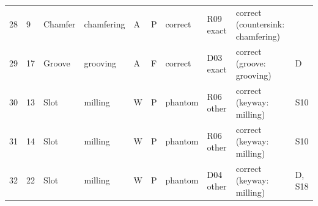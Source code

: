 \begin{table}[htbp]
{\begin{tabular}{p{0.45cm} p{0.55cm} p{1.5cm} p{1.5cm} p{0.4cm} p{0.4cm} p{1.1cm} p{1.4cm} p{3.6cm} p{0.6cm}}
28 & 9 & Chamfer & chamfering & A & P & correct & R09 exact & correct (countersink: chamfering) &  \\
29 & 17 & Groove & grooving & A & F & correct & D03 exact & correct (groove: grooving) & D \\
30 & 13 & Slot & milling & W & P & phantom & R06 other & correct (keyway: milling) & S10 \\
31 & 14 & Slot & milling & W & P & phantom & R06 other & correct (keyway: milling) & S10 \\
32 & 22 & Slot & milling & W & P & phantom & D04 other & correct (keyway: milling) & D, S18 \\
\bottomrule
\end{tabular}}
\end{table}
